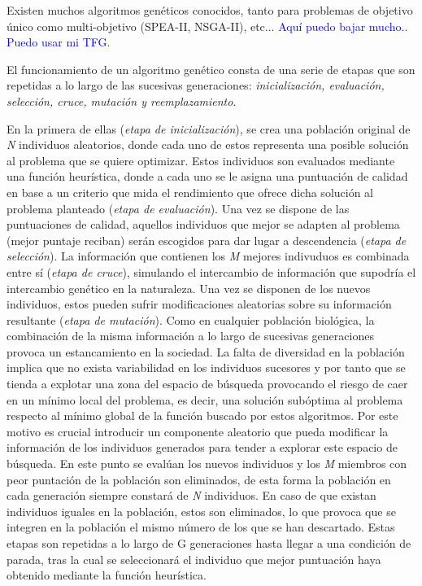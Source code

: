 \documentclass{uathesis-es}
\begin{document}
Existen muchos algoritmos genéticos conocidos, tanto para problemas de objetivo único como multi-objetivo (SPEA-II, NSGA-II), etc... \textcolor{blue}{Aquí puedo bajar mucho.. Puedo usar mi TFG.}

El funcionamiento de un algoritmo genético consta de una serie de etapas que son repetidas a lo largo de las sucesivas generaciones: \textit{inicialización, evaluación, selección, cruce, mutación y reemplazamiento}.

En la primera de ellas (\textit{etapa de inicialización}), se crea una población original de \textit{N} individuos aleatorios, donde cada uno de estos representa una posible solución al problema que se quiere optimizar. Estos individuos son evaluados mediante una función heurística, donde a cada uno se le asigna una puntuación de calidad en base a un criterio que mida el rendimiento que ofrece dicha solución al problema planteado (\textit{etapa de evaluación}). Una vez se dispone de las puntuaciones de calidad, aquellos individuos que mejor se adapten al problema (mejor puntaje reciban) serán escogidos para dar lugar a descendencia (\textit{etapa de selección}). La información que contienen los \textit{M} mejores indivuduos es combinada entre sí (\textit{etapa de cruce}), simulando el intercambio de información que supodría el intercambio genético en la naturaleza. Una vez se disponen de los nuevos individuos, estos pueden sufrir modificaciones aleatorias sobre su información resultante (\textit{etapa de mutación}). Como en cualquier población biológica, la combinación  de la misma información a lo largo de sucesivas generaciones provoca un estancamiento en la sociedad. La falta de diversidad en la población implica que no exista variabilidad en los individuos sucesores y por tanto que se tienda a explotar una zona del espacio de búsqueda provocando el riesgo de caer en un mínimo local del problema, es decir, una solución subóptima al problema respecto al mínimo global de la función buscado por estos algoritmos. Por este motivo es crucial introducir un componente aleatorio que pueda modificar la información de los individuos generados para tender a explorar este espacio de búsqueda. En este punto se evalúan los nuevos individuos y los \textit{M} miembros con peor puntación de la población son eliminados, de esta forma la población en cada generación siempre constará de \textit{N} individuos. En caso de que existan individuos iguales en la población, estos son eliminados, lo que provoca que se integren en la población el mismo número de los que se han descartado. Estas etapas son repetidas a lo largo de G generaciones hasta llegar a una condición de parada, tras la cual se seleccionará el individuo que mejor puntuación haya obtenido mediante la función heurística.
\end{document}
